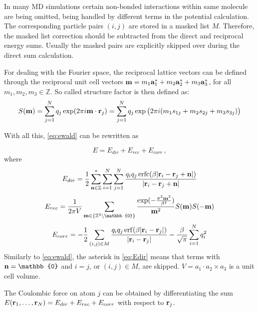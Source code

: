 \documentclass[12pt,a4paper]{report}
\newcommand{\draft}[1]{#1}
\DeclareMathOperator\erf{erf}
\DeclareMathOperator\erfc{erfc}
\begin{document}
In many MD simulations certain non-bonded interactions within same molecule are being omitted, being handled by different terms in the potential calculation. The corresponding particle pairs $(i, j)$ are stored in a masked list $M$. Therefore, the masked list correction should be subtracted from the direct and reciprocal energy sums. Usually the masked pairs are explicitly skipped over during the direct sum calculation.	 

For dealing with the Fourier space, the reciprocal lattice vectors can be defined through the reciprocal unit cell vectors $\bold{m} = m_1 \bold{a}_1^* + m_2 \bold{a}_2^* + m_3 \bold{a}_3^*$, for
all $m_1, m_2, m_3 \in \mathbb{Z}$. 
So called structure factor is then defined as:
\begin{equation} \label{eq:Sm}
 S(\bold{m}) = 
\sum\limits_{j=1}^Nq_j \exp(2\pi i\bold{m}\cdot\bold{r}_j)= 
\sum\limits_{j=1}^Nq_j \exp\big(2\pi i(m_1 s_{1j} + m_2 s_{2j}+m_3 s_{3j})\big)
\end{equation}

With all this, \eqref{eq:ewald} can be rewritten as

\[E = E_{dir} + E_{rec} + E_{corr}\,\mathrm{,}\]
where
\begin{equation} \label{eq:Edir}
E_{dir} = \frac{1}{2}\sum\limits_{\bold{n\in \mathbb{Z}}}^*\sum\limits_{i=1}^N\sum\limits_{j=1}^N\frac{q_i q_j \erfc(\beta\lvert\bold{r}_i - \bold{r}_j + \bold{n} \rvert)}{\lvert\bold{r}_i - \bold{r}_j + \bold{n} \rvert}
\end{equation}
\begin{equation} \label{eq:Erec}
E_{rec}=\frac{1}{2\pi V}\sum\limits_{\bold{m} \in \{\mathbb{Z}^3 \setminus \mathbb{0}\}}\frac{\exp(-\frac{\pi^2\bold{m}^2}{\beta^2})}{\bold{m}^2}S(\bold{m})S(\bold{-m})
\end{equation}
\[E_{corr} = -\frac{1}{2}\sum\limits_{(i,j)\in M}\frac{q_i q_j \erf(\beta\lvert\bold{r}_i - \bold{r}_j\rvert)}{\lvert\bold{r}_i - \bold{r}_j\rvert} - \frac{\beta}{\sqrt{\pi}}\sum\limits_{i=1}^N q_i^2\]
Similarly to \eqref{eq:ewald}, the asterisk in \eqref{eq:Edir} means that terms with $\bold{n} = \mathbb{0}$ and $i = j$, or $(i,j)\in M$, are skipped.
$V = a_1 \cdot a_2 \times a_3$ is a unit cell volume.

The Coulombic force on atom $j$ can be obtained by differentiating the sum $E(\bold{r}_1, \dotsc, \bold{r}_N) = E_{dir} + E_{rec} + E_{corr}$ with respect to $\bold{r}_j$. 

\end{document}
